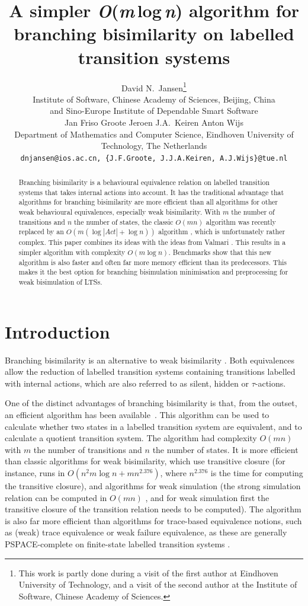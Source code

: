 \documentclass[a4paper,10pt]{article}
\title{\bf A simpler \textit{O}(\textit{m}\,log\,\textit{n}) algorithm for branching bisimilarity on labelled transition systems}
\author{
David N.\ Jansen\thanks{This work is partly done during a visit of the first author at Eindhoven University of Technology, and
a visit of the second author at the Institute of Software, Chinese Academy of Sciences.}\\
\small Institute of Software, Chinese Academy of Sciences, Beijing, China\\[-0.5ex]
\small and Sino-Europe Institute of Dependable Smart Software\vspace{2ex}\\
%
%
Jan Friso Groote\footnotemark[1]\hspace{1cm}
%
Jeroen J.A.\ Keiren\hspace{1cm}
%
Anton Wijs\\
%
\small Department of Mathematics and Computer Science, Eindhoven University of Technology, The Netherlands\vspace{2ex}\\
%
\small\texttt{dnjansen@ios.ac.cn, \{J.F.Groote, J.J.A.Keiren, A.J.Wijs\}@tue.nl}
}
\date{}
\theoremstyle{definition}
\theoremstyle{plain}
\newcommand{\bigo}[1]{{O\!\left(#1\right)}}
\newcommand{\size}[1]{\left\lvert #1 \right\rvert}
\begin{document}
\maketitle
\begin{abstract}
\noindent%
Branching bisimilarity is a behavioural equivalence relation on labelled transition systems
that takes internal actions into account.
It has the traditional advantage that algorithms for branching bisimilarity
are more efficient than all algorithms for other weak behavioural equivalences, especially weak bisimilarity.
With $m$ the number of transitions and $n$ the number of states,
the classic $\bigo{m n}$ algorithm was recently replaced by an $\bigo{m (\log \size{\mathit{Act}} + \log n)}$ algorithm \cite{GJKW2017}, which is unfortunately rather complex.
This paper combines its ideas with the ideas from Valmari \cite{Valmari2009}.
This results in a simpler algorithm with complexity $\bigo{m \log n}$.
Benchmarks show that this new algorithm is also faster and often far more memory efficient
than its predecessors.
This makes it the best option for branching bisimulation minimisation and preprocessing for weak bisimulation of LTSs.
\end{abstract}

\section{Introduction}
Branching bisimilarity \cite{DBLP:journals/jacm/GlabbeekW96} is an alternative to weak bisimilarity \cite{DBLP:books/sp/Milner80}.
Both equivalences allow the reduction of labelled transition systems containing transitions labelled with internal actions, which are also referred to as silent, hidden or $\tau$-actions.

One of the distinct advantages of branching bisimilarity is that, from the outset, an efficient
algorithm has been available~\cite{GV90}.
This algorithm can be used to calculate whether two states in a labelled transition system are equivalent,
and to calculate a quotient transition system.
The algorithm had complexity $\bigo{mn}$ with $m$ the number of transitions and $n$ the number of states.
It is more efficient than classic algorithms for weak bisimilarity,
which use transitive closure (for instance, \cite{KannellakisSmolka1990} runs in $\bigo{n^2m\log n + mn^{2.376}}$, where $n^{2.376}$ is the time for computing the transitive closure), and algorithms for weak simulation (the strong simulation relation can be computed in $\bigo{mn}$ \cite{HHK1995}, and for weak simulation first the transitive closure of the transition relation needs to be computed).
The algorithm is also far more efficient than algorithms for trace-based equivalence
notions, such as (weak) trace equivalence or weak failure equivalence,
as these are generally PSPACE-complete on finite-state labelled transition systems \cite{KannellakisSmolka1990}.
\end{document}
